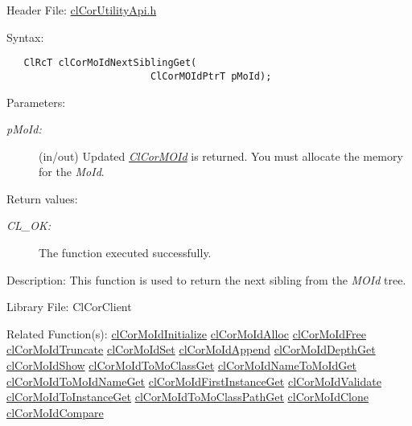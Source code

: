 \begin{Desc}
\item[Header File:]\hyperlink{cl_cor_utility_api_8h}{cl\-Cor\-Utility\-Api.h}\end{Desc}
\begin{Desc}
\item[Syntax:]

\footnotesize\begin{verbatim}   ClRcT clCorMoIdNextSiblingGet(
                         ClCorMOIdPtrT pMoId);  
\end{verbatim}
\normalsize
\end{Desc}
\begin{Desc}
\item[Parameters:]
\begin{description}
\item[{\em p\-Mo\-Id:}](in/out) Updated {\em \hyperlink{struct_cl_cor_m_o_id}{Cl\-Cor\-MOId}\/} is returned. You must allocate the memory for the {\em Mo\-Id\/}.\end{description}
\end{Desc}
\begin{Desc}
\item[Return values:]
\begin{description}
\item[{\em CL\_\-OK:}]The function executed successfully.\end{description}
\end{Desc}
\begin{Desc}
\item[Description:]This function is used to return the next sibling from the {\em MOId\/} tree.\end{Desc}
\begin{Desc}
\item[Library File:]Cl\-Cor\-Client\end{Desc}
\begin{Desc}
\item[Related Function(s):]\hyperlink{group__group13}{cl\-Cor\-Mo\-Id\-Initialize} \hyperlink{group__group13}{cl\-Cor\-Mo\-Id\-Alloc} \hyperlink{group__group13}{cl\-Cor\-Mo\-Id\-Free} \hyperlink{group__group13}{cl\-Cor\-Mo\-Id\-Truncate} \hyperlink{group__group13}{cl\-Cor\-Mo\-Id\-Set} \hyperlink{group__group13}{cl\-Cor\-Mo\-Id\-Append} \hyperlink{group__group13}{cl\-Cor\-Mo\-Id\-Depth\-Get} \hyperlink{group__group13}{cl\-Cor\-Mo\-Id\-Show} \hyperlink{group__group13}{cl\-Cor\-Mo\-Id\-To\-Mo\-Class\-Get} \hyperlink{group__group13}{cl\-Cor\-Mo\-Id\-Name\-To\-Mo\-Id\-Get} \hyperlink{group__group13}{cl\-Cor\-Mo\-Id\-To\-Mo\-Id\-Name\-Get} \hyperlink{group__group13}{cl\-Cor\-Mo\-Id\-First\-Instance\-Get} \hyperlink{group__group13}{cl\-Cor\-Mo\-Id\-Validate} \hyperlink{group__group13}{cl\-Cor\-Mo\-Id\-To\-Instance\-Get} \hyperlink{group__group13}{cl\-Cor\-Mo\-Id\-To\-Mo\-Class\-Path\-Get} \hyperlink{group__group13}{cl\-Cor\-Mo\-Id\-Clone} \hyperlink{group__group13}{cl\-Cor\-Mo\-Id\-Compare} \end{Desc}
